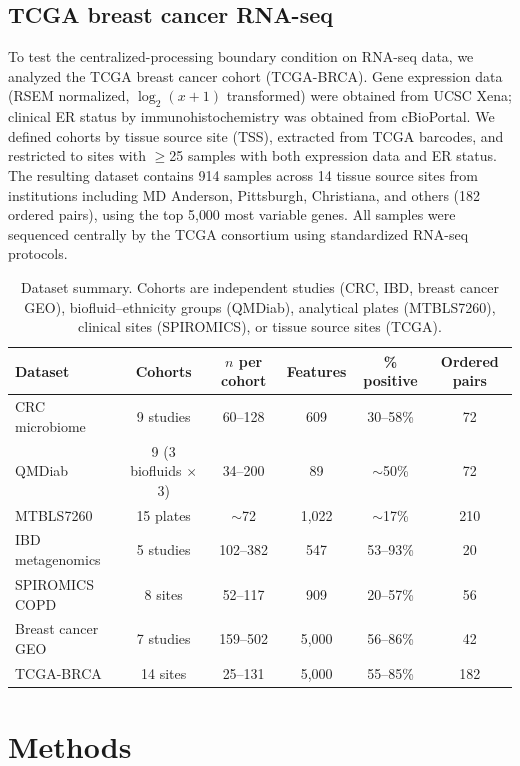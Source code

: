 \documentclass[11pt]{article}
\begin{document}
\subsection{TCGA breast cancer RNA-seq}
\label{sec:tcga_data}

To test the centralized-processing boundary condition on RNA-seq data, we analyzed the TCGA breast cancer cohort (TCGA-BRCA). Gene expression data (RSEM normalized, $\log_2(x+1)$ transformed) were obtained from UCSC Xena; clinical ER status by immunohistochemistry was obtained from cBioPortal. We defined cohorts by tissue source site (TSS), extracted from TCGA barcodes, and restricted to sites with $\geq$25 samples with both expression data and ER status. The resulting dataset contains 914 samples across 14 tissue source sites from institutions including MD Anderson, Pittsburgh, Christiana, and others (182 ordered pairs), using the top 5{,}000 most variable genes. All samples were sequenced centrally by the TCGA consortium using standardized RNA-seq protocols.

\begin{table}[t]
\centering
\caption{Dataset summary. Cohorts are independent studies (CRC, IBD, breast cancer GEO), biofluid--ethnicity groups (QMDiab), analytical plates (MTBLS7260), clinical sites (SPIROMICS), or tissue source sites (TCGA).}
\label{tab:cohorts}
\begin{tabular}{lccccc}
\toprule
Dataset & Cohorts & $n$ per cohort & Features & \% positive & Ordered pairs \\
\midrule
CRC microbiome & 9 studies & 60--128 & 609 & 30--58\% & 72 \\
QMDiab & 9 (3 biofluids $\times$ 3) & 34--200 & 89 & $\sim$50\% & 72 \\
MTBLS7260 & 15 plates & $\sim$72 & 1{,}022 & $\sim$17\% & 210 \\
IBD metagenomics & 5 studies & 102--382 & 547 & 53--93\% & 20 \\
SPIROMICS COPD & 8 sites & 52--117 & 909 & 20--57\% & 56 \\
Breast cancer GEO & 7 studies & 159--502 & 5{,}000 & 56--86\% & 42 \\
TCGA-BRCA & 14 sites & 25--131 & 5{,}000 & 55--85\% & 182 \\
\bottomrule
\end{tabular}
\end{table}


\section{Methods}
\label{sec:methods}
\end{document}
